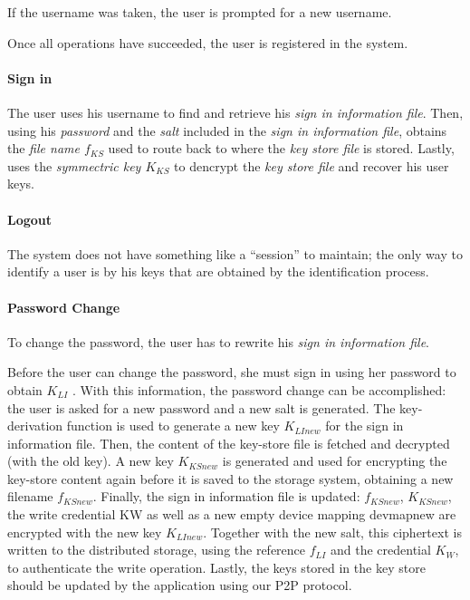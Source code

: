 \documentclass[12pt,spanish]{article}
\begin{document}
If the username was taken,
the user is prompted for a new username.

Once all operations
have succeeded, the user is registered in the system.



\paragraph{Sign in}
The user uses his username to find and retrieve his \textit{sign in information
file}. Then, using his \textit{password} and the \textit{salt} included in the
\textit{sign in information file}, obtains the \textit{file name $f_{KS}$} used to
route back to where the \textit{key store file} is stored.  Lastly, uses the
\textit{symmectric key $K_{KS}$} to dencrypt the \textit{key store file} and recover
his user keys.

\paragraph{Logout}
The system does not have something like a ``session'' to maintain; the only way
to identify a user is by his keys that are obtained by the identification
process.


\paragraph{Password Change}
To change the password, the user has to rewrite his \textit{sign in information
file}.

Before the user can change the password, she must sign in using her password to
obtain $K_{LI}$ . With this information, the password change can be accomplished:
the user is asked for a new password and a new salt is
generated. The key-derivation function is used to generate a new key
$K_{LInew}$
for the sign in information file. Then, the content of the key-store file is
fetched and decrypted (with the old key). A new key $K_{KSnew}$ is generated and
used for encrypting the key-store content again before it is saved to the
storage system, obtaining a new filename $f_{KSnew}$.
Finally, the sign in information file
is updated: $f_{KSnew}$, $K_{KSnew}$, the write credential KW as well as a new empty
device mapping devmapnew are encrypted with the new key $K_{LInew}$.
  Together with the new salt, this ciphertext is written to the distributed
storage, using the reference $f_{LI}$ and the credential $K_W$, to authenticate the
write operation. Lastly, the keys stored in the key store should be updated by
the application using our P2P protocol.
\end{document}
